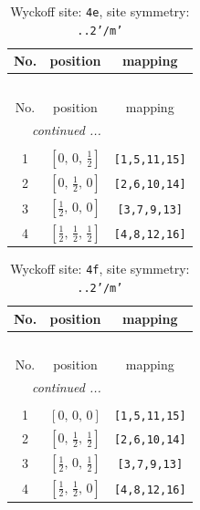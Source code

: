 \documentclass[fleqn,8pt]{jsarticle}
\begin{document}
\renewcommand{\arraystretch}{1.2}
\begin{longtable}{ccc}
\caption{Wyckoff site: {\tt 4e}, site symmetry: {\tt ..2'/m'}}
 \\
 \hline \hline
No. & position & mapping \\ \hline \endfirsthead

\multicolumn{2}{l}{\tablename\ \thetable{}} \\
 \hline \hline
No. & position & mapping \\ \hline \endhead

 \hline \hline
\multicolumn{2}{r}{\footnotesize\it continued ...} \\ \endfoot

 \hline \hline
\multicolumn{2}{r}{} \\ \endlastfoot

1 & $\left[ 0,\, 0,\, \frac{1}{2} \right]$ & {\tt [1,5,11,15]} \\ \hline
2 & $\left[ 0,\, \frac{1}{2},\, 0 \right]$ & {\tt [2,6,10,14]} \\ \hline
3 & $\left[ \frac{1}{2},\, 0,\, 0 \right]$ & {\tt [3,7,9,13]} \\ \hline
4 & $\left[ \frac{1}{2},\, \frac{1}{2},\, \frac{1}{2} \right]$ & {\tt [4,8,12,16]} \\
\end{longtable}
\renewcommand{\arraystretch}{1.2}
\begin{longtable}{ccc}
\caption{Wyckoff site: {\tt 4f}, site symmetry: {\tt ..2'/m'}}
 \\
 \hline \hline
No. & position & mapping \\ \hline \endfirsthead

\multicolumn{2}{l}{\tablename\ \thetable{}} \\
 \hline \hline
No. & position & mapping \\ \hline \endhead

 \hline \hline
\multicolumn{2}{r}{\footnotesize\it continued ...} \\ \endfoot

 \hline \hline
\multicolumn{2}{r}{} \\ \endlastfoot

1 & $\left[ 0,\, 0,\, 0 \right]$ & {\tt [1,5,11,15]} \\ \hline
2 & $\left[ 0,\, \frac{1}{2},\, \frac{1}{2} \right]$ & {\tt [2,6,10,14]} \\ \hline
3 & $\left[ \frac{1}{2},\, 0,\, \frac{1}{2} \right]$ & {\tt [3,7,9,13]} \\ \hline
4 & $\left[ \frac{1}{2},\, \frac{1}{2},\, 0 \right]$ & {\tt [4,8,12,16]} \\
\end{longtable}
\end{document}
